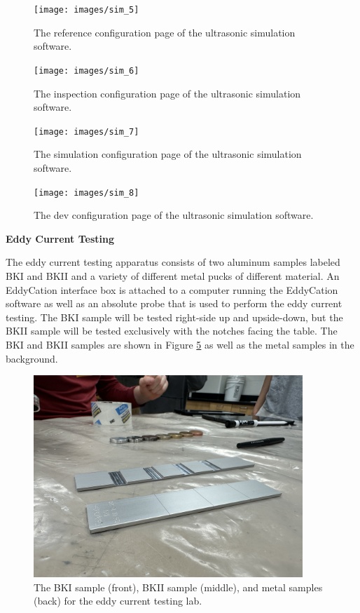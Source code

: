 \documentclass[12 pt]{report}
\begin{document}
\begin{figure}[htbp]
	\centering
	\texttt{[image: images/sim\_5]}
	\caption{The reference configuration page of the ultrasonic simulation software.}
	\label{fig:sim_5}
\end{figure}

\begin{figure}[htbp]
	\centering
	\texttt{[image: images/sim\_6]}
	\caption{The inspection configuration page of the ultrasonic simulation software.}
	\label{fig:sim_6}
\end{figure}

\begin{figure}[htbp]
	\centering
	\texttt{[image: images/sim\_7]}
	\caption{The simulation configuration page of the ultrasonic simulation software.}
	\label{fig:sim_7}
\end{figure}

\begin{figure}[htbp]
	\centering
	\texttt{[image: images/sim\_8]}
	\caption{The dev configuration page of the ultrasonic simulation software.}
	\label{fig:sim_8}
\end{figure}

\newpage

\textbf{Eddy Current Testing}

The eddy current testing apparatus consists of two aluminum samples labeled BKI and BKII and a variety of different metal pucks of different material. An EddyCation interface box is attached to a computer running the EddyCation software as well as an absolute probe that is used to perform the eddy current testing. The BKI sample will be tested right-side up and upside-down, but the BKII sample will be tested exclusively with the notches facing the table. The BKI and BKII samples are shown in Figure \ref{fig:eddy_current_apparatus} as well as the metal samples in the background.

\begin{figure}[htbp]
	\centering
	\includegraphics[width=4in]{images/eddy_current_apparatus}
	\caption{The BKI sample (front), BKII sample (middle), and metal samples (back) for the eddy current testing lab.}
	\label{fig:eddy_current_apparatus}
\end{figure}
\end{document}

